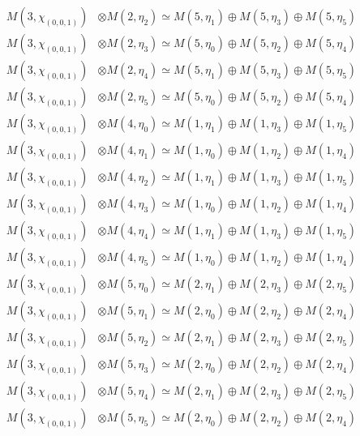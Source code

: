 \begin{align*}
M(3,\chi_{(0,0,1)}) &\otimes M(2,\eta_{2}) \simeq M(5,\eta_{1}) \oplus M(5,\eta_{3}) \oplus M(5,\eta_{5}) \\
M(3,\chi_{(0,0,1)}) &\otimes M(2,\eta_{3}) \simeq M(5,\eta_{0}) \oplus M(5,\eta_{2}) \oplus M(5,\eta_{4}) \\
M(3,\chi_{(0,0,1)}) &\otimes M(2,\eta_{4}) \simeq M(5,\eta_{1}) \oplus M(5,\eta_{3}) \oplus M(5,\eta_{5}) \\
M(3,\chi_{(0,0,1)}) &\otimes M(2,\eta_{5}) \simeq M(5,\eta_{0}) \oplus M(5,\eta_{2}) \oplus M(5,\eta_{4}) \\
M(3,\chi_{(0,0,1)}) &\otimes M(4,\eta_{0}) \simeq M(1,\eta_{1}) \oplus M(1,\eta_{3}) \oplus M(1,\eta_{5}) \\
M(3,\chi_{(0,0,1)}) &\otimes M(4,\eta_{1}) \simeq M(1,\eta_{0}) \oplus M(1,\eta_{2}) \oplus M(1,\eta_{4}) \\
M(3,\chi_{(0,0,1)}) &\otimes M(4,\eta_{2}) \simeq M(1,\eta_{1}) \oplus M(1,\eta_{3}) \oplus M(1,\eta_{5}) \\
M(3,\chi_{(0,0,1)}) &\otimes M(4,\eta_{3}) \simeq M(1,\eta_{0}) \oplus M(1,\eta_{2}) \oplus M(1,\eta_{4}) \\
M(3,\chi_{(0,0,1)}) &\otimes M(4,\eta_{4}) \simeq M(1,\eta_{1}) \oplus M(1,\eta_{3}) \oplus M(1,\eta_{5}) \\
M(3,\chi_{(0,0,1)}) &\otimes M(4,\eta_{5}) \simeq M(1,\eta_{0}) \oplus M(1,\eta_{2}) \oplus M(1,\eta_{4}) \\
M(3,\chi_{(0,0,1)}) &\otimes M(5,\eta_{0}) \simeq M(2,\eta_{1}) \oplus M(2,\eta_{3}) \oplus M(2,\eta_{5}) \\
M(3,\chi_{(0,0,1)}) &\otimes M(5,\eta_{1}) \simeq M(2,\eta_{0}) \oplus M(2,\eta_{2}) \oplus M(2,\eta_{4}) \\
M(3,\chi_{(0,0,1)}) &\otimes M(5,\eta_{2}) \simeq M(2,\eta_{1}) \oplus M(2,\eta_{3}) \oplus M(2,\eta_{5}) \\
M(3,\chi_{(0,0,1)}) &\otimes M(5,\eta_{3}) \simeq M(2,\eta_{0}) \oplus M(2,\eta_{2}) \oplus M(2,\eta_{4}) \\
M(3,\chi_{(0,0,1)}) &\otimes M(5,\eta_{4}) \simeq M(2,\eta_{1}) \oplus M(2,\eta_{3}) \oplus M(2,\eta_{5}) \\
M(3,\chi_{(0,0,1)}) &\otimes M(5,\eta_{5}) \simeq M(2,\eta_{0}) \oplus M(2,\eta_{2}) \oplus M(2,\eta_{4}) \\
\end{align*}

